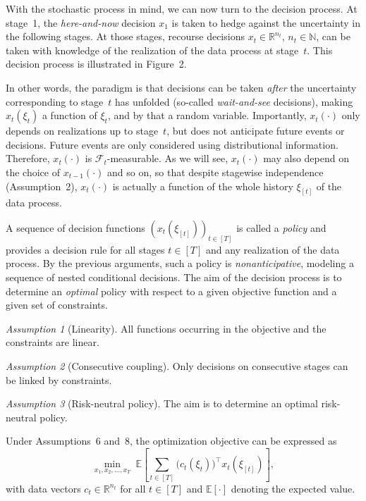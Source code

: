 \documentclass{article}
\theoremstyle{remark}
\newtheorem{assumption}{Assumption}
\begin{document}
With the stochastic process in mind, we can now turn to the decision process. 
At stage~1, the \emph{here-and-now} decision $x_1$ is taken to hedge against the 
uncertainty in the following stages. At those stages, recourse decisions 
$x_t \in \mathbb{R}^{n_t}$, $n_t \in \mathbb{N}$, can be taken with knowledge of the 
realization of the data process at stage~$t$. This decision process is illustrated 
in Figure~2.

In other words, the paradigm is that decisions can be taken \emph{after} the 
uncertainty corresponding to stage~$t$ has unfolded (so-called \emph{wait-and-see} decisions), making $x_t(\xi_t)$ a function of $\xi_t$, and by that a random variable. Importantly, $x_t(\cdot)$ only depends on 
realizations up to stage~$t$, but does not anticipate future events or decisions. 
Future events are only considered using distributional information. Therefore, 
$x_t(\cdot)$ is $\mathcal{F}_t$-measurable. As we will see, $x_t(\cdot)$ 
may also depend on the choice of $x_{t-1}(\cdot)$ and so on, so that despite 
stagewise independence (Assumption~2), $x_t(\cdot)$ is actually a function of the 
whole history $\xi_{[t]}$ of the data process.

A sequence of decision functions $(x_t(\xi_{[t]}))_{t \in [T]}$ is called a 
\emph{policy} and provides a decision rule for all stages $t \in [T]$ and any 
realization of the data process. By the previous arguments, such a policy is 
\emph{nonanticipative}, modeling a sequence of nested conditional decisions. 
The aim of the decision process is to determine an \emph{optimal} policy with respect to a given objective function and a given set of constraints. 

\begin{assumption}[Linearity]
All functions occurring in the objective and the constraints are linear.
\end{assumption}

\begin{assumption}[Consecutive coupling]
Only decisions on consecutive stages can be linked by constraints.
\end{assumption}

\begin{assumption}[Risk-neutral policy]
The aim is to determine an optimal risk-neutral policy.
\end{assumption}

Under Assumptions~6 and~8, the optimization objective can be expressed as
\begin{equation}\label{eq:objective}
\min_{x_1,x_2,\ldots,x_T} \;
\mathbb{E}\!\left[
\sum_{t \in [T]} \big(c_t(\xi_t)\big)^{\top} x_t(\xi_{[t]})
\right],
\end{equation}
with data vectors $c_t \in \mathbb{R}^{n_t}$ for all $t \in [T]$ and $\mathbb{E}[\cdot]$ 
denoting the expected value.
\end{document}
